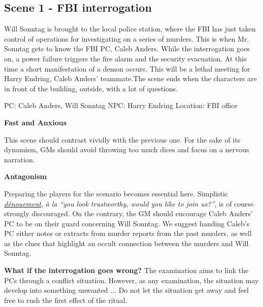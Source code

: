 \subsection{Scene 1 - FBI interrogation}

\begin{scene_summary}
Will Sonntag is brought to the local police station, where the FBI has just
taken control of operations for investigating on a series of murders. This is
when Mr. Sonntag gets to know the FBI PC, Caleb Anders. While the interrogation goes on, a power failure triggers the fire alarm and the security evacuation. At this time a short manifestation of a demon occurs. This will be a lethal meeting for Harry Endring, Caleb Anders' teammate.The scene ends when the characters are in front of the building, outside, with a lot of questions.
\end{scene_summary}

\begin{scene_tag}
PC: Caleb Anders, Will Sonntag
NPC: Harry Endring
Location: FBI office
\end{scene_tag}

\begin{leading_idea}
{\bf Fast and Anxious}

This scene should contrast vividly with the previous one. For the sake of its
dynamism, GMs should avoid throwing too much dices and focus on a nervous
narration.

{\bf Antagonism}

Preparing the players for the scenario becomes essential here. Simplistic
\href{http://deadgentlemen.com/projects/the-gamers/the-gamers/}{\textit{d\'enouement}},
\textit{\`a la} \textit{``you look trustworthy, would you like to join us?''},
is of course strongly discouraged. On the contrary, the GM should encourage
Caleb Anders' PC to be on their guard concerning Will Sonntag.  We suggest
handing Caleb's PC either notes or extracts from murder reports from the past
murders, as well as the clues that highlight an occult connection between the
murders and Will Sonntag.
\end{leading_idea}

\begin{sidenote}
{\bf What if the interrogation goes wrong?}
The examination aims to link the PCs through a conflict situation. However, as
any examination, the situation may develop into something unwanted ... Do not
let the situation get away and feel free to rush the first effect of
the ritual.
\end{sidenote}

